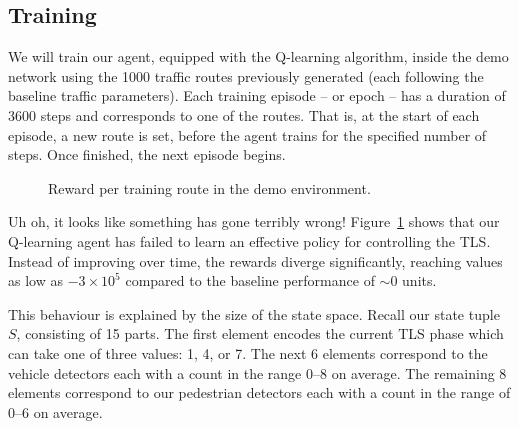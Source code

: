 \documentclass[a4paper]{report}
\begin{document}
\subsection{Training} \label{q_learning_training}

We will train our agent, equipped with the Q-learning algorithm, inside the demo network using the 1000 traffic routes previously generated (each following the baseline traffic parameters). Each training episode -- or epoch -- has a duration of 3600 steps and corresponds to one of the routes. That is, at the start of each episode, a new route is set, before the agent trains for the specified number of steps. Once finished, the next episode begins.

\begin{figure}[H]
  \centering
  \caption{Reward per training route in the demo environment.}
  \label{fig:q_learning_demo_train}
\end{figure}

Uh oh, it looks like something has gone terribly wrong! Figure~\ref{fig:q_learning_demo_train}\footnotemark{} shows that our Q-learning agent has failed to learn an effective policy for controlling the TLS. Instead of improving over time, the rewards diverge significantly, reaching values as low as $-3\times10^5$ compared to the baseline performance of $\sim0$ units.

This behaviour is explained by the size of the state space. Recall our state tuple $S$, consisting of 15 parts. The first element encodes the current TLS phase which can take one of three values: 1, 4, or 7. The next 6 elements correspond to the vehicle detectors each with a count in the range 0--8 on average. The remaining 8 elements correspond to our pedestrian detectors each with a count in the range of 0--6 on average.  
\end{document}
